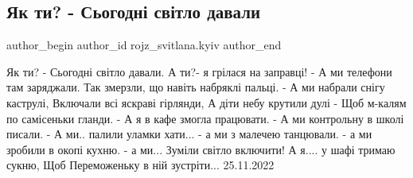  
 
 
 
 
 
\subsection{Як ти? - Сьогодні світло давали}
\label{sec:25_11_2022.fb.rojz_svitlana.kyiv.1.jak_ty_svitlo_davaly}
 
\ifcmt
 author_begin
   author_id rojz_svitlana.kyiv
 author_end
\fi

\obeycr
Як ти? - Сьогодні світло давали. 
А ти?- я грілася на заправці! 
- А ми телефони там заряджали. 
Так змерзли, що навіть набряклі пальці.
- А ми набрали снігу каструлі, 
Включали всі яскраві гірлянди, 
А діти небу крутили дулі - 
Щоб м-калям по самісеньки гланди. 
- А я в кафе змогла працювати.
- А ми контрольну в школі писали.
- А ми.. палили уламки хати...
- а ми з малечею танцювали. 
- а ми зробили в окопі кухню. 
- а ми... Зуміли світло включити!
А я.... у шафі тримаю сукню, 
Щоб Переможеньку в ній зустріти...
25.11.2022
\restorecr

